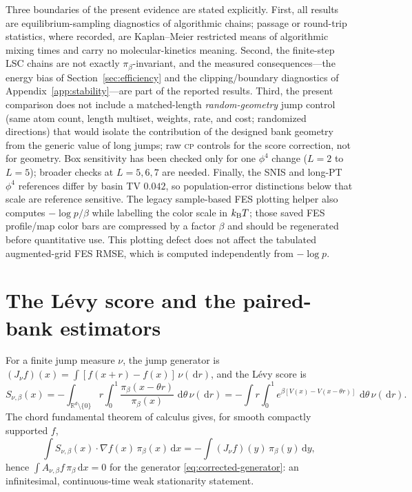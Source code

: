 \documentclass[11pt]{article}
\newcommand{\R}{\mathbb{R}}
\newcommand{\dd}{\,\mathrm{d}}
\newcommand{\piB}{\pi_\beta}
\begin{document}
Three boundaries of the present evidence are stated explicitly.  First, all
results are equilibrium-sampling diagnostics of algorithmic chains; passage
or round-trip statistics, where recorded, are Kaplan--Meier restricted means
of algorithmic mixing times and carry no molecular-kinetics meaning.  Second,
the finite-step LSC chains are not exactly $\piB$-invariant, and the measured
consequences---the energy bias of Section~\ref{sec:efficiency} and the
clipping/boundary diagnostics of Appendix~\ref{app:stability}---are part of
the reported results.  Third, the present comparison does not include a
matched-length \emph{random-geometry} jump control (same atom count, length
multiset, weights, rate, and cost; randomized directions) that would isolate
the contribution of the designed bank geometry from the generic value of long
jumps; raw \textsc{cp} controls for the score correction, not for geometry.
Box sensitivity has been checked only for one $\phi^4$ change ($L=2$ to
$L=5$); broader checks at $L=5,6,7$ are needed.  Finally, the SNIS and long-PT
$\phi^4$ references differ by basin TV $0.042$, so population-error
distinctions below that scale are reference sensitive.
The legacy sample-based FES plotting helper also computes $-\log p/\beta$
while labelling the color scale in $k_{\rm B}T$; those saved FES profile/map
color bars are compressed by a factor $\beta$ and should be regenerated
before quantitative use.  This plotting defect does not affect the tabulated
augmented-grid FES RMSE, which is computed independently from $-\log p$.

\clearpage
\appendix

\section{The L\'evy score and the paired-bank estimators}
\label{app:construction}

For a finite jump measure $\nu$, the jump generator is
$(J_\nu f)(x)=\int[f(x+r)-f(x)]\,\nu(\dd r)$, and the L\'evy score is
\begin{equation}
 S_{\nu,\beta}(x)
 =-\int_{\R^d\setminus\{0\}} r\int_0^1
   \frac{\piB(x-\theta r)}{\piB(x)}\,\dd\theta\,\nu(\dd r)
 =-\int r\int_0^1
   e^{\beta[V(x)-V(x-\theta r)]}\,\dd\theta\,\nu(\dd r).
 \label{eq:levy-score}
\end{equation}
The chord fundamental theorem of calculus gives, for smooth compactly
supported $f$,
\begin{equation}
 \int S_{\nu,\beta}(x)\cdot\nabla f(x)\,\piB(x)\dd x
 =-\int (J_\nu f)(y)\,\piB(y)\dd y,
 \label{eq:weak-cancel}
\end{equation}
hence $\int A_{\nu,\beta}f\,\piB\dd x=0$ for the generator
\eqref{eq:corrected-generator}: an infinitesimal, continuous-time weak
stationarity statement.
\end{document}
